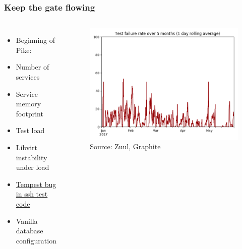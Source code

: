 \documentclass[aspectratio=169,11pt,hyperref={colorlinks=true}]{beamer}
\begin{document}
\begin{frame}
    \frametitle{Keep the gate flowing}
       \begin{columns}
    \begin{itemize}
        \item{Beginning of Pike:}
        \item{Number of services}
        \item{Service memory footprint}
        \item{Test load}
        \item{Libvirt instability under load}
        \item{\href{https://review.openstack.org/\#/c/439638/}{Tempest bug in ssh test code}}
        \item{Vanilla database configuration}
    \end{itemize}
    \begin{figure}
    \begin{center}
    	\includegraphics[width=1\textwidth]{failure_rate.png}
         \caption{Source: Zuul, Graphite}
    \end{center}
    \end{figure}
       \end{columns}
\end{frame}

\end{document}
